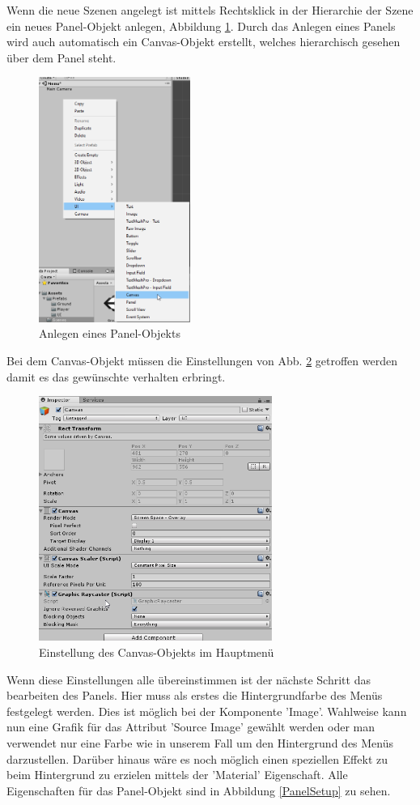 Wenn die neue Szenen angelegt ist mittels Rechtsklick in der Hierarchie der Szene ein neues Panel-Objekt anlegen, Abbildung \ref{PanelAnlegen}. Durch das Anlegen eines Panels wird auch automatisch ein Canvas-Objekt erstellt, welches hierarchisch gesehen über dem Panel steht.

\begin{figure}[H]

	\includegraphics[height=8cm]{images/PanelAnlegen.png}
	\caption{Anlegen eines Panel-Objekts}
	\label{PanelAnlegen}
\end{figure}
Bei dem Canvas-Objekt müssen die Einstellungen von Abb. \ref{CanvasSetup} getroffen werden damit es das gewünschte verhalten erbringt.
\begin{figure}[H]
	\centering
	\includegraphics[height=8cm]{images/CanvasSetup.png}
	\caption{Einstellung des Canvas-Objekts im Hauptmenü}
	\label{CanvasSetup}
\end{figure}
Wenn diese Einstellungen alle übereinstimmen ist der nächste Schritt das bearbeiten des Panels. Hier muss als erstes die Hintergrundfarbe des Menüs festgelegt werden. Dies ist möglich bei der Komponente 'Image'. Wahlweise kann nun eine Grafik für das Attribut 'Source Image' gewählt werden oder man verwendet nur eine Farbe wie in unserem Fall um den Hintergrund des Menüs darzustellen. Darüber hinaus wäre es noch möglich einen speziellen Effekt zu beim Hintergrund zu erzielen mittels der 'Material' Eigenschaft. Alle Eigenschaften für das Panel-Objekt sind in Abbildung \ref{PanelSetup} zu sehen.
